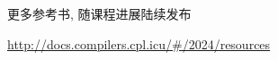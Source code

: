 \begin{frame}{}
  \begin{center}
    更多参考书, 随课程进展陆续发布


    \pause
    \vspace{0.30cm}
    \url{http://docs.compilers.cpl.icu/\#/2024/resources}
  \end{center}
\end{frame}
